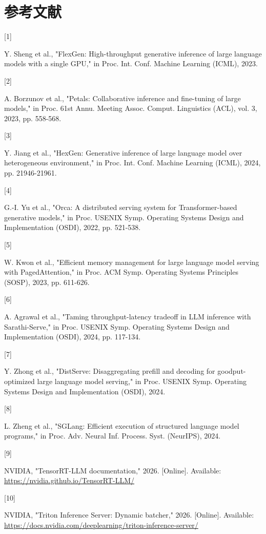 \clearpage
{}
\section*{参考文献}

\hypertarget{ref:1}{[1]} Y. Sheng et al., "FlexGen: High-throughput generative inference of large language models with a single GPU," in Proc. Int. Conf. Machine Learning (ICML), 2023.


\hypertarget{ref:2}{[2]} A. Borzunov et al., "Petals: Collaborative inference and fine-tuning of large models," in Proc. 61st Annu. Meeting Assoc. Comput. Linguistics (ACL), vol. 3, 2023, pp. 558-568.


\hypertarget{ref:3}{[3]} Y. Jiang et al., "HexGen: Generative inference of large language model over heterogeneous environment," in Proc. Int. Conf. Machine Learning (ICML), 2024, pp. 21946-21961.


\hypertarget{ref:4}{[4]} G.-I. Yu et al., "Orca: A distributed serving system for Transformer-based generative models," in Proc. USENIX Symp. Operating Systems Design and Implementation (OSDI), 2022, pp. 521-538.


\hypertarget{ref:5}{[5]} W. Kwon et al., "Efficient memory management for large language model serving with PagedAttention," in Proc. ACM Symp. Operating Systems Principles (SOSP), 2023, pp. 611-626.


\hypertarget{ref:6}{[6]} A. Agrawal et al., "Taming throughput-latency tradeoff in LLM inference with Sarathi-Serve," in Proc. USENIX Symp. Operating Systems Design and Implementation (OSDI), 2024, pp. 117-134.


\hypertarget{ref:7}{[7]} Y. Zhong et al., "DistServe: Disaggregating prefill and decoding for goodput-optimized large language model serving," in Proc. USENIX Symp. Operating Systems Design and Implementation (OSDI), 2024.


\hypertarget{ref:8}{[8]} L. Zheng et al., "SGLang: Efficient execution of structured language model programs," in Proc. Adv. Neural Inf. Process. Syst. (NeurIPS), 2024.


\hypertarget{ref:9}{[9]} NVIDIA, "TensorRT-LLM documentation," 2026. [Online]. Available: \href{https://nvidia.github.io/TensorRT-LLM/}{\url{https://nvidia.github.io/TensorRT-LLM/}}


\hypertarget{ref:10}{[10]} NVIDIA, "Triton Inference Server: Dynamic batcher," 2026. [Online]. Available: \href{https://docs.nvidia.com/deeplearning/triton-inference-server/}{\url{https://docs.nvidia.com/deeplearning/triton-inference-server/}}



